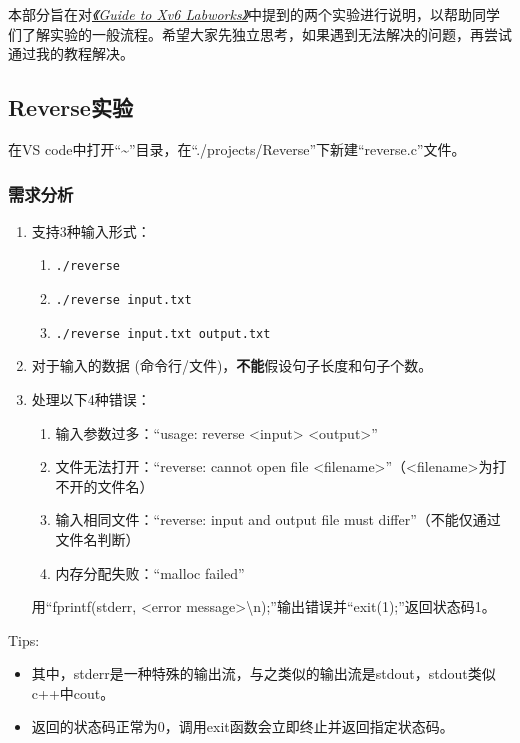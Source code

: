 \documentclass[fontset=ubuntu]{ctexart}
\let\oldhref\href{}
\renewcommand{\href}[2]{\oldhref{#1}{\textit{#2}}}
\begin{document}
本部分旨在对\href{https://www.overleaf.com/read/bfhkrzwmhrrs}{《Guide to Xv6 Labworks》}中提到的两个实验进行说明，以帮助同学们了解实验的一般流程。希望大家先独立思考，如果遇到无法解决的问题，再尝试通过我的教程解决。

\subsection{Reverse实验}

在VS code中打开“\~{}”目录，在“./projects/Reverse”下新建“reverse.c”文件。

\subsubsection{需求分析}

\begin{enumerate}
    \item 支持3种输入形式：
          \begin{enumerate}
              \item \texttt{./reverse}
              \item \texttt{./reverse input.txt}
              \item \texttt{./reverse input.txt output.txt}
          \end{enumerate}
    \item 对于输入的数据 (命令行/文件)，\textbf{不能}假设句子长度和句子个数。
    \item 处理以下4种错误：
          \begin{enumerate}
              \item 输入参数过多：“usage: reverse <input> <output>”
              \item 文件无法打开：“reverse: cannot open file <filename>”（<filename>为打不开的文件名）
              \item 输入相同文件：“reverse: input and output file must differ”（不能仅通过文件名判断）
              \item 内存分配失败：“malloc failed”
          \end{enumerate}
          用“fprintf(stderr, <error message>\textbackslash{}n);”输出错误并“exit(1);”返回状态码1。%
\end{enumerate}

\noindent Tips:
\vspace{-0.5cm}
\begin{itemize}
    \item 其中，stderr是一种特殊的输出流，与之类似的输出流是stdout，stdout类似c++中cout。
    \item 返回的状态码正常为0，调用exit函数会立即终止并返回指定状态码。
\end{itemize}
\end{document}
